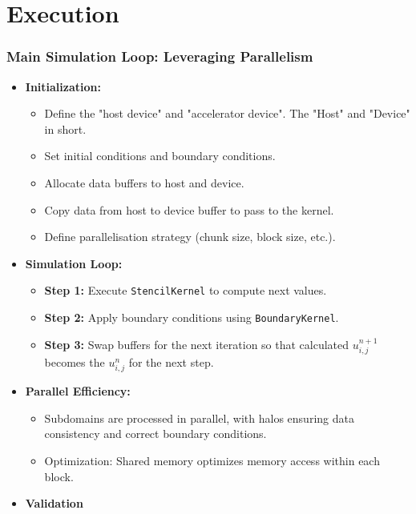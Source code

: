 \documentclass[9pt]{beamer}
\begin{document}
\section{Execution}

\begin{frame}
\frametitle{Main Simulation Loop: Leveraging Parallelism}
\begin{itemize}
    \item \textbf{Initialization:}
    \begin{itemize}
        \item Define the "host device" and "accelerator device". The "Host" and "Device" in short.
        \item Set initial conditions and boundary conditions.
        \item Allocate data buffers to host and device.
        \item Copy data from host to device buffer to pass to the kernel.
        \item Define parallelisation strategy (chunk size, block size, etc.).
    \end{itemize}
    \item \textbf{Simulation Loop:}
    \begin{itemize}
        \item \textbf{Step 1:} Execute \texttt{StencilKernel} to compute next values.
        \item \textbf{Step 2:} Apply boundary conditions using \texttt{BoundaryKernel}.
        \item \textbf{Step 3:} Swap buffers for the next iteration so that calculated  $u_{i,j}^{n+1}$ becomes the $u_{i,j}^{n}$ for the next step.
    \end{itemize}
    \item \textbf{Parallel Efficiency:}
    \begin{itemize}
        \item Subdomains are processed in parallel, with halos ensuring data consistency and correct boundary conditions.
        \item Optimization: Shared memory optimizes memory access within each block.
    \end{itemize}
    \item \textbf{Validation}
\end{itemize}
\end{frame}
\end{document}
